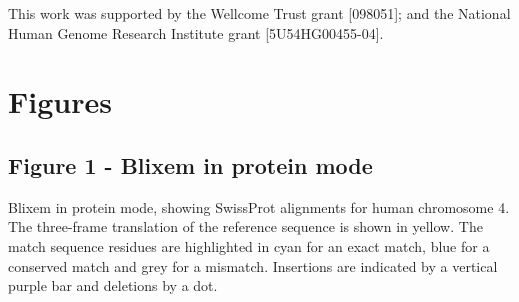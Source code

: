 \documentclass[10pt]{bmc_article}
\newenvironment{bmcformat}{\begin{raggedright}\baselineskip20pt\sloppy\setboolean{publ}{false}}{\end{raggedright}\baselineskip20pt\sloppy}
\begin{document}
\begin{bmcformat}
This work was supported by the Wellcome Trust grant [098051]; and the National Human Genome Research Institute grant [5U54HG00455-04].

 


{
   }     %





\section*{Figures}
\subsection*{Figure 1 - Blixem in protein mode}
Blixem in protein mode, showing SwissProt alignments for human chromosome 4. The three-frame translation of the reference sequence is shown in yellow. The match sequence residues are highlighted in cyan for an exact match, blue for a conserved match and grey for a mismatch. Insertions are indicated by a vertical purple bar and deletions by a dot.


\end{bmcformat}
\end{document}
